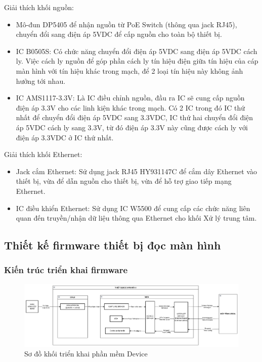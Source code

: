 Giải thích khối nguồn:
\begin{itemize}
    \item Mô-đun DP5405 để nhận nguồn từ PoE Switch (thông qua jack RJ45), chuyển đổi sang điện áp 5VDC để cấp nguồn cho toàn bộ thiết bị.
    
    \item IC B0505S: Có chức năng chuyển đổi điện áp 5VDC sang điện áp 5VDC cách ly. Việc cách ly nguồn để góp phần cách ly tín hiệu điện giữa tín hiệu của cáp màn hình với tín hiệu khác trong mạch, để 2 loại tín hiệu này không ảnh hưởng tới nhau.
    
    \item IC AMS1117-3.3V: Là IC điều chỉnh nguồn, đầu ra IC sẽ cung cấp nguồn điện áp 3.3V cho các linh kiện khác trong mạch. Có 2 IC trong đó IC thứ nhất để chuyển đổi điện áp 5VDC sang 3.3VDC, IC thứ hai chuyển đổi điện áp 5VDC cách ly sang 3.3V, từ đó điện áp 3.3V này cũng được cách ly với điện áp 3.3VDC ở IC thứ nhất. 
\end{itemize}

Giải thích khối Ethernet:

\begin{itemize}
    \item Jack cắm Ethernet: Sử dụng jack RJ45 HY931147C để cắm dây Ethernet vào thiết bị, vừa để dẫn nguồn cho thiết bị, vừa để hỗ trợ giao tiếp mạng Ethernet.
    \item IC điều khiển Ethernet: Sử dụng IC W5500 để cung cấp các chức năng liên quan đến truyền/nhận dữ liệu thông qua Ethernet cho khối Xử lý trung tâm.
\end{itemize}

\subsection{Thiết kế firmware thiết bị đọc màn hình}

\subsubsection {Kiến trúc triển khai firmware}

\begin{figure}[!ht]
    \centering
    \includegraphics[width=1.0\linewidth]{Figures/Chap3_Device-block-firmware-architecture.png}
    \caption{Sơ đồ khối triển khai phần mềm Device}
    \label{fig:hinh3.8}
\end{figure}

